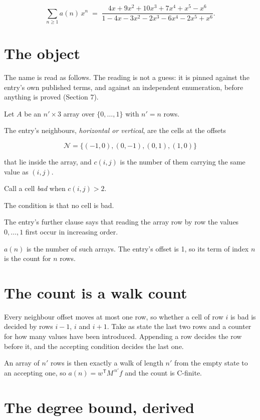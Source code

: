 \documentclass[11pt]{article}
\theoremstyle{definition}
\begin{document}
\[\sum_{n \ge 1} a(n)\,x^n \;=\; \frac{4x + 9x^{2} + 10x^{3} + 7x^{4} + x^{5} - x^{6}}{1 - 4x - 3x^{2} - 2x^{3} - 6x^{4} - 2x^{5} + x^{6}}.\]

\section{The object}

The name is read as follows. The reading is not a guess: it is pinned against the entry's own published terms, and against an independent enumeration, before anything is proved (Section 7).

Let $A$ be an $n' \times 3$ array over $\{0,\dots,1\}$ with $n' = n$ rows.

The entry's neighbours, {\itshape horizontal or vertical}, are the cells at the offsets

\[\mathcal{N} = \{(-1,0), (0,-1), (0,1), (1,0)\}\]

that lie inside the array, and $c(i,j)$ is the number of them carrying the same value as $(i,j)$.

Call a cell {\itshape bad} when $c(i,j) > 2$.

The condition is that no cell is bad.

The entry's further clause says that reading the array row by row the values $0,\dots,1$ first occur in increasing order.

$a(n)$ is the number of such arrays. The entry's offset is 1, so its term of index $n$ is the count for $n$ rows.

\section{The count is a walk count}

Every neighbour offset moves at most one row, so whether a cell of row $i$ is bad is decided by rows $i-1$, $i$ and $i+1$. Take as state the last two rows and a counter for how many values have been introduced. Appending a row decides the row before it, and the accepting condition decides the last one.

An array of $n'$ rows is then exactly a walk of length $n'$ from the empty state to an accepting one, so $a(n) = w^{\mathsf T}M^{\,n'}f$ and the count is C-finite.

\section{The degree bound, derived}
\end{document}
